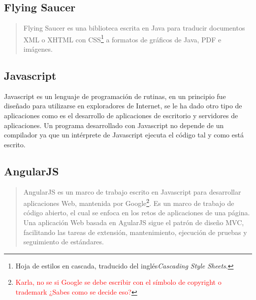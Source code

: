 \subsection{Flying Saucer}\label{sec:flying-saucer}
\begin{quote}
	Flying Saucer es una biblioteca escrita en Java para traducir documentos XML o XHTML con CSS\footnote{Hoja de estilos en cascada, traducido del inglés\textit{Cascading Style Sheets}.} a formatos de gráficos de Java, PDF e imágenes\cite{FlyingSaucer}.
\end{quote}

\subsection{Javascript}\label{sec:javascript}
Javascript es un lenguaje de programación de rutinas, en un principio fue diseñado para utilizarse en exploradores de Internet, se le ha dado otro tipo de aplicaciones como es el desarrollo de aplicaciones de escritorio y servidores de aplicaciones. Un programa desarrollado con Javascript no depende de un compilador ya que un intérprete de Javascript ejecuta el código tal y como está escrito\cite{LearningWebDesign}.

\subsection{AngularJS}\label{sec:angularjs}

\begin{quote}
	AngularJS es un marco de trabajo escrito en Javascript para desarrollar aplicaciones Web, mantenida por Google\textsuperscript{\textcopyright}\footnote{\textcolor{red}{Karla, no se si Google se debe escribir con el símbolo de copyright \textcopyright o trademark \texttrademark ¿Sabes como se decide eso?}}. Es un marco de trabajo de código abierto, el cual se enfoca en los retos de aplicaciones de una página. Una aplicación Web basada en AgularJS sigue el patrón de diseño MVC, facilitando las tareas de extensión, mantenimiento, ejecución de pruebas y seguimiento de estándares\cite{FullStackAngularJS}.
\end{quote}

